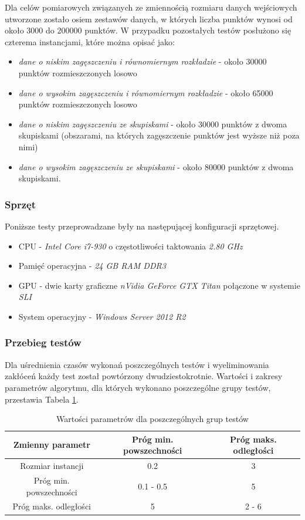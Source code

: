 \documentclass[12pt]{article}
\begin{document}
Dla celów pomiarowych związanych ze zmiennością rozmiaru danych wejściowych utworzone zostało osiem zestawów danych, w których liczba punktów wynosi od około 3000 do 200000 punktów. W przypadku pozostałych testów posłużono się czterema instancjami, które można opisać jako:

\begin{itemize}
\item \textit{dane o niskim zagęszczeniu i równomiernym rozkładzie} - około 30000 punktów rozmieszczonych losowo
\item \textit{dane o wysokim zagęszczeniu i równomiernym rozkładzie} - około 65000 punktów rozmieszczonych losowo
\item \textit{dane o niskim zagęszczeniu ze skupiskami} - około 30000 punktów z dwoma skupiskami (obszarami, na których zagęszczenie punktów jest wyższe niż poza nimi)
\item \textit{dane o wysokim zagęszczeniu ze skupiskami} - około 80000 punktów z dwoma skupiskami.
\end{itemize}

\subsubsection{Sprzęt}

Poniższe testy przeprowadzane były na następującej konfiguracji sprzętowej. 

\begin{itemize}
\item CPU - \textit{Intel Core i7-930} o częstotliwości taktowania \textit{2.80 GHz}
\item Pamięć operacyjna - \textit{24 GB RAM DDR3}
\item GPU - dwie karty graficzne \textit{nVidia GeForce GTX Titan} połączone w systemie \textit{SLI}
\item System operacyjny - \textit{Windows Server 2012 R2}
\end{itemize}

\subsubsection{Przebieg testów}

Dla uśrednienia czasów wykonań poszczególnych testów i wyeliminowania zakłóceń każdy test został powtórzony dwudziestokrotnie. Wartości i zakresy parametrów algorytmu, dla których wykonano poszczególne grupy testów, przestawia Tabela \ref{tab:params}.

\begin{table}[h!]
\centering
\begin{tabular}{|c|c|c|}
\hline
\textbf{Zmienny parametr} & \textbf{Próg min. powszechności} & \textbf{Próg maks. odległości} \\
\hline
Rozmiar instancji & 0.2 & 3 \\
Próg min. powszechności & 0.1 - 0.5 & 5 \\
Próg maks. odległości & 5 & 2 - 6 \\
\hline
\end{tabular}
\caption{Wartości parametrów dla poszczególnych grup testów}
\label{tab:params}
\end{table}
\end{document}
